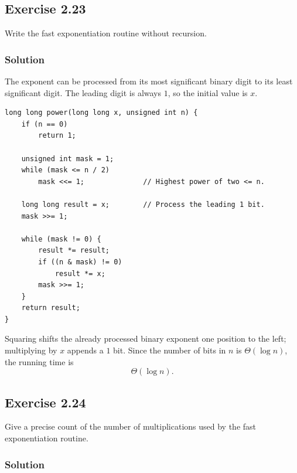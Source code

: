 \documentclass[12pt,a4paper]{article}
\begin{document}
\subsection*{\color{sectionnavy}Exercise 2.23}

\noindent
Write the fast exponentiation routine without recursion.

\subsubsection*{\color{sectionnavy}Solution}

The exponent can be processed from its most significant binary digit to
its least significant digit. The leading digit is always $1$, so the
initial value is $x$.

\begin{lstlisting}
long long power(long long x, unsigned int n) {
    if (n == 0)
        return 1;

    unsigned int mask = 1;
    while (mask <= n / 2)
        mask <<= 1;              // Highest power of two <= n.

    long long result = x;        // Process the leading 1 bit.
    mask >>= 1;

    while (mask != 0) {
        result *= result;
        if ((n & mask) != 0)
            result *= x;
        mask >>= 1;
    }
    return result;
}
\end{lstlisting}

Squaring shifts the already processed binary exponent one position to
the left; multiplying by $x$ appends a $1$ bit. Since the number of bits
in $n$ is $\Theta(\log n)$, the running time is
\[
\boxed{\Theta(\log n)}.
\]

\subsection*{\color{sectionnavy}Exercise 2.24}

\noindent
Give a precise count of the number of multiplications used by the fast
exponentiation routine.

\subsubsection*{\color{sectionnavy}Solution}
\end{document}
